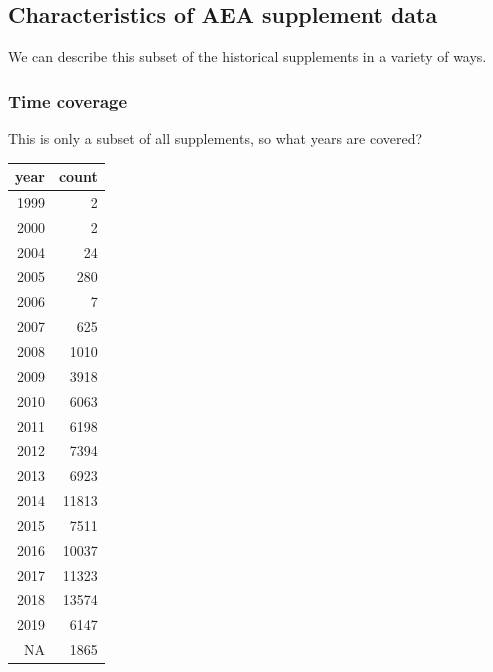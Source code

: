 \documentclass[]{article}
\begin{document}
\hypertarget{characteristics-of-aea-supplement-data}{%
\subsection{Characteristics of AEA supplement
data}\label{characteristics-of-aea-supplement-data}}

We can describe this subset of the historical supplements in a variety
of ways.

\hypertarget{time-coverage}{%
\subsubsection{Time coverage}\label{time-coverage}}

This is only a subset of all supplements, so what years are covered?

\begin{table}[H]
\centering
\begin{tabular}{r|r}
\hline
year & count\\
\hline
1999 & 2\\
\hline
2000 & 2\\
\hline
2004 & 24\\
\hline
2005 & 280\\
\hline
2006 & 7\\
\hline
2007 & 625\\
\hline
2008 & 1010\\
\hline
2009 & 3918\\
\hline
2010 & 6063\\
\hline
2011 & 6198\\
\hline
2012 & 7394\\
\hline
2013 & 6923\\
\hline
2014 & 11813\\
\hline
2015 & 7511\\
\hline
2016 & 10037\\
\hline
2017 & 11323\\
\hline
2018 & 13574\\
\hline
2019 & 6147\\
\hline
NA & 1865\\
\hline
\end{tabular}
\end{table}
\end{document}
